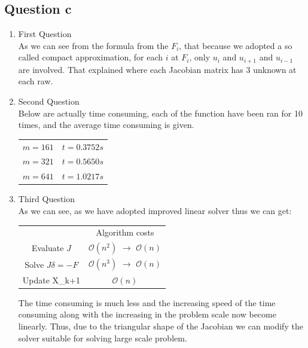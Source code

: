 \documentclass[11pt]{article}
\begin{document}
    \subsection{Question c}
    \begin{enumerate}
    \item First Question \\
    As we can see from the formula from the $F_i$, that because we adopted a so called compact approximation, for each $i$ at $F_i$, only $u_i$ and $u_{i+1}$ and $u_{i-1}$ are involved. That explained where each Jacobian matrix has 3 unknown at each raw.
    \item Second Question \\
    Below are actually time consuming, each of the function have been ran for 10 times, and the average time consuming is given.
    \begin{center}
    \begin{tabular}{c c}
    $ m = 161$ & $ t = 0.3752s$\\
    $ m = 321$ & $ t = 0.5650s$\\
    $ m = 641$ & $ t = 1.0217s$\\
    \end{tabular}
    \end{center}
    \item Third Question \\
    As we can see, as we have adopted improved linear solver thus we can get:
    \begin{center}
    \begin{tabular}{c c}
     & Algorithm costs\\
    Evaluate $J$ & $\mathcal{O}(n^2)$ $\rightarrow$ $\mathcal{O}(n)$ \\
    Solve $J\delta = -F$ & $\mathcal{O}(n^3)$ $\rightarrow$ $\mathcal{O}(n)$\\
    Update X_{k+1} & $\mathcal{O}(n)$
    \end{tabular}
    \end{center} 
    The time consuming is much less and the increasing speed of the time consuming along with the increasing in the problem scale now become linearly. Thus, due to the triangular shape of the Jacobian we can modify the solver suitable for solving large scale problem.
    \end{enumerate}
    
\end{document}

